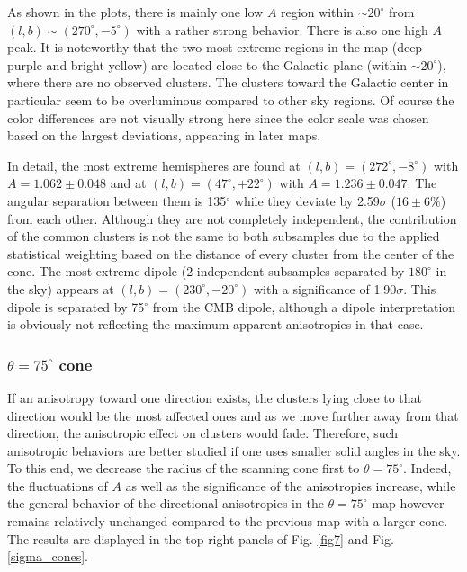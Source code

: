 \documentclass{aa}   %
\begin{document}
As shown in the plots, there is mainly one low $A$ region within $\sim 20^{\circ}$ from $(l,b)\sim (270^{\circ}, -5^{\circ})$ with a rather strong behavior. There is also one high $A$ peak. It is noteworthy that the two most extreme regions in the map (deep purple and bright yellow) are located close to the Galactic plane (within $\sim 20^{\circ}$), where there are no observed clusters. The clusters toward the Galactic center in particular seem to be overluminous compared to other sky regions. Of course the color differences are not visually strong here since the color scale was chosen based on the largest deviations, appearing in later maps.

In detail, the most extreme hemispheres are found at $(l,b)=(272^{\circ}, -8^{\circ})$ with $A=1.062\pm 0.048$ and at $(l,b)=(47^{\circ}, +22^{\circ})$ with $A=1.236\pm 0.047$. The angular separation between them is 135$^{\circ}$  while they deviate by 2.59$\sigma$ ($16\pm 6\%$) from each other. Although they are not completely independent, the contribution of the common clusters is not the same to both subsamples due to the applied statistical weighting based on the distance of every cluster from the center of the cone. 
The most extreme dipole (2 independent subsamples separated by $180^{\circ}$ in the sky) appears at $(l,b)=(230^{\circ}, -20^{\circ})$ with a significance of 1.90$\sigma$. This dipole is separated by 75$^{\circ}$ from the CMB dipole, although a dipole interpretation is obviously not reflecting the maximum apparent anisotropies in that case.

\subsubsection{$\theta=75^{\circ}$ cone}

If an anisotropy toward one direction exists, the clusters lying close to that direction would be the most affected ones and as we move further away from that direction, the anisotropic effect on clusters would fade. Therefore, such anisotropic behaviors are better studied if one uses smaller solid angles in the sky. To this end, we decrease the radius of the scanning cone first to $\theta=75^{\circ}$. Indeed, the fluctuations of $A$ as well as the significance of the anisotropies increase, while the general behavior of the directional anisotropies in the $\theta=75^{\circ}$ map however remains relatively unchanged compared to the previous map with a larger cone. The results are displayed in the top right panels of Fig. \ref{fig7} and Fig. \ref{sigma_cones}.  
\end{document}
